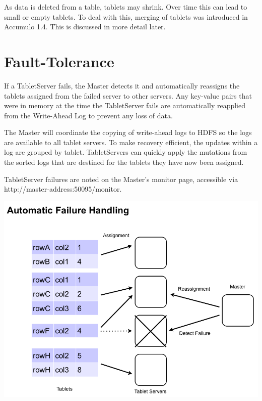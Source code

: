 As data is deleted from a table, tablets may shrink. Over time this can lead
to small or empty tablets. To deal with this, merging of tablets was
introduced in Accumulo 1.4. This is discussed in more detail later.

\section{Fault-Tolerance}

If a TabletServer fails, the Master detects it and automatically reassigns the tablets
assigned from the failed server to other servers. Any key-value pairs that were in
memory at the time the TabletServer fails are automatically reapplied from the Write-Ahead
Log to prevent any loss of data.

The Master will coordinate the copying of write-ahead logs to HDFS so the logs
are available to all tablet servers. To make recovery efficient, the updates
within a log are grouped by tablet. TabletServers can quickly apply the
mutations from the sorted logs that are destined for the tablets they have now
been assigned.

TabletServer failures are noted on the Master's monitor page, accessible via\\
\mbox{http://master-address:50095/monitor}.

\begin{center}
\includegraphics[scale=0.4]{images/failure_handling.png}
\end{center}

